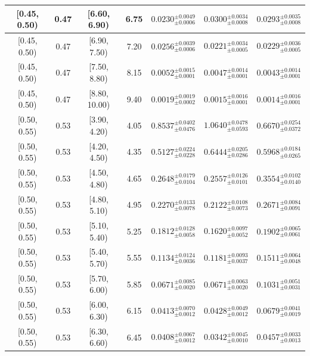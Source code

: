 \begin{longtable}{|c|c|c|c|c|c|c|}
[0.45, 0.50) & 0.47 & [6.60, 6.90) & 6.75 & $0.0230^{ \pm 0.0049 }_{ \pm 0.0006 }$ & $0.0300^{ \pm 0.0034 }_{ \pm 0.0008 }$ & $0.0293^{ \pm 0.0035 }_{ \pm 0.0008 }$ \\ 
\hline
[0.45, 0.50) & 0.47 & [6.90, 7.50) & 7.20 & $0.0256^{ \pm 0.0039 }_{ \pm 0.0006 }$ & $0.0221^{ \pm 0.0034 }_{ \pm 0.0005 }$ & $0.0229^{ \pm 0.0036 }_{ \pm 0.0005 }$ \\ 
\hline
[0.45, 0.50) & 0.47 & [7.50, 8.80) & 8.15 & $0.0052^{ \pm 0.0015 }_{ \pm 0.0001 }$ & $0.0047^{ \pm 0.0014 }_{ \pm 0.0001 }$ & $0.0043^{ \pm 0.0014 }_{ \pm 0.0001 }$ \\ 
\hline
[0.45, 0.50) & 0.47 & [8.80, 10.00) & 9.40 & $0.0019^{ \pm 0.0019 }_{ \pm 0.0002 }$ & $0.0015^{ \pm 0.0016 }_{ \pm 0.0001 }$ & $0.0014^{ \pm 0.0016 }_{ \pm 0.0001 }$ \\ 
\hline
[0.50, 0.55) & 0.53 & [3.90, 4.20) & 4.05 & $0.8537^{ \pm 0.0402 }_{ \pm 0.0476 }$ & $1.0640^{ \pm 0.0478 }_{ \pm 0.0593 }$ & $0.6670^{ \pm 0.0254 }_{ \pm 0.0372 }$ \\ 
\hline
[0.50, 0.55) & 0.53 & [4.20, 4.50) & 4.35 & $0.5127^{ \pm 0.0224 }_{ \pm 0.0228 }$ & $0.6444^{ \pm 0.0205 }_{ \pm 0.0286 }$ & $0.5968^{ \pm 0.0184 }_{ \pm 0.0265 }$ \\ 
\hline
[0.50, 0.55) & 0.53 & [4.50, 4.80) & 4.65 & $0.2648^{ \pm 0.0179 }_{ \pm 0.0104 }$ & $0.2557^{ \pm 0.0126 }_{ \pm 0.0101 }$ & $0.3554^{ \pm 0.0102 }_{ \pm 0.0140 }$ \\ 
\hline
[0.50, 0.55) & 0.53 & [4.80, 5.10) & 4.95 & $0.2270^{ \pm 0.0133 }_{ \pm 0.0078 }$ & $0.2122^{ \pm 0.0108 }_{ \pm 0.0073 }$ & $0.2671^{ \pm 0.0084 }_{ \pm 0.0091 }$ \\ 
\hline
[0.50, 0.55) & 0.53 & [5.10, 5.40) & 5.25 & $0.1812^{ \pm 0.0128 }_{ \pm 0.0058 }$ & $0.1620^{ \pm 0.0097 }_{ \pm 0.0052 }$ & $0.1902^{ \pm 0.0065 }_{ \pm 0.0061 }$ \\ 
\hline
[0.50, 0.55) & 0.53 & [5.40, 5.70) & 5.55 & $0.1134^{ \pm 0.0124 }_{ \pm 0.0036 }$ & $0.1181^{ \pm 0.0093 }_{ \pm 0.0037 }$ & $0.1511^{ \pm 0.0064 }_{ \pm 0.0048 }$ \\ 
\hline
[0.50, 0.55) & 0.53 & [5.70, 6.00) & 5.85 & $0.0671^{ \pm 0.0085 }_{ \pm 0.0020 }$ & $0.0671^{ \pm 0.0063 }_{ \pm 0.0020 }$ & $0.1031^{ \pm 0.0051 }_{ \pm 0.0031 }$ \\ 
\hline
[0.50, 0.55) & 0.53 & [6.00, 6.30) & 6.15 & $0.0413^{ \pm 0.0070 }_{ \pm 0.0012 }$ & $0.0428^{ \pm 0.0049 }_{ \pm 0.0012 }$ & $0.0679^{ \pm 0.0041 }_{ \pm 0.0019 }$ \\ 
\hline
[0.50, 0.55) & 0.53 & [6.30, 6.60) & 6.45 & $0.0408^{ \pm 0.0067 }_{ \pm 0.0012 }$ & $0.0342^{ \pm 0.0045 }_{ \pm 0.0010 }$ & $0.0457^{ \pm 0.0033 }_{ \pm 0.0013 }$ \\ 

\end{longtable}
